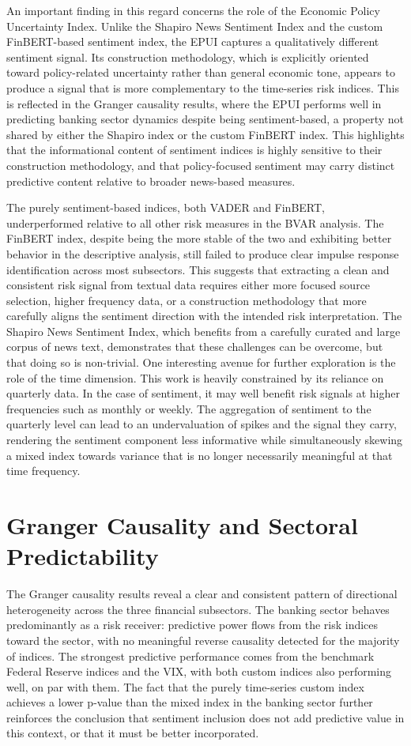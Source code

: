 \documentclass[12pt,a4paper]{report}
\begin{document}
An important finding in this regard concerns the role of the Economic Policy
Uncertainty Index. Unlike the Shapiro News Sentiment Index and the custom
FinBERT-based sentiment index, the EPUI captures a qualitatively different
sentiment signal. Its construction methodology, which is explicitly oriented toward
policy-related uncertainty rather than general economic tone, appears to produce
a signal that is more complementary to the time-series risk indices. This is
reflected in the Granger causality results, where the EPUI performs well in
predicting banking sector dynamics despite being sentiment-based, a property not
shared by either the Shapiro index or the custom FinBERT index. This highlights 
that the informational content of sentiment indices is highly sensitive to their
construction methodology, and that policy-focused sentiment may carry distinct
predictive content relative to broader news-based measures.

The purely sentiment-based indices, both VADER and FinBERT, underperformed
relative to all other risk measures in the BVAR analysis. The FinBERT index,
despite being the more stable of the two and exhibiting better behavior in the
descriptive analysis, still failed to produce clear impulse response identification
across most subsectors. This suggests that extracting a clean and consistent risk
signal from textual data requires either more focused source selection, higher
frequency data, or a construction methodology that more carefully aligns the
sentiment direction with the intended risk interpretation. The Shapiro News
Sentiment Index, which benefits from a carefully curated and large corpus of
news text, demonstrates that these challenges can be overcome, but that doing
so is non-trivial. One interesting avenue for further exploration is the role of the time dimension. This work is heavily constrained by its reliance on quarterly data. In the case of sentiment, it may well benefit risk signals at higher frequencies such as monthly or weekly. The aggregation of sentiment to the quarterly level can lead to an undervaluation of spikes and the signal they carry, rendering the sentiment component less informative while simultaneously skewing a mixed index towards variance that is no longer necessarily meaningful at that time frequency.  
\section{Granger Causality and Sectoral Predictability}

The Granger causality results reveal a clear and consistent pattern of directional heterogeneity across the three financial subsectors. The banking sector behaves predominantly as a risk receiver: predictive power flows from the risk indices toward the sector, with no meaningful reverse causality detected for the majority of indices. The strongest predictive performance comes from the benchmark Federal Reserve indices and the VIX, with both custom indices also performing well, on par with them. The fact that the purely time-series custom index achieves a lower p-value than the mixed index in the banking sector further reinforces the conclusion that sentiment inclusion does not add predictive value in this context, or that it must be better incorporated.
\end{document}
